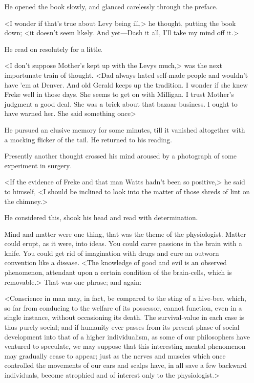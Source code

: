 He opened the book slowly, and glanced carelessly through the preface.

<I wonder if that's true about Levy being ill,> he thought, putting the book down; <it doesn't seem likely. And yet—Dash it all, I'll take my mind off it.>

He read on resolutely for a little.

<I don't suppose Mother's kept up with the Levys much,> was the next importunate train of thought. <Dad always hated self-made people and wouldn't have 'em at Denver. And old Gerald keeps up the tradition. I wonder if she knew Freke well in those days. She seems to get on with Milligan. I trust Mother's judgment a good deal. She was a brick about that bazaar business. I ought to have warned her. She said something once\longdash>

He pursued an elusive memory for some minutes, till it vanished altogether with a mocking flicker of the tail. He returned to his reading.

Presently another thought crossed his mind aroused by a photograph of some experiment in surgery.

<If the evidence of Freke and that man Watts hadn't been so positive,> he said to himself, <I should be inclined to look into the matter of those shreds of lint on the chimney.>

He considered this, shook his head and read with determination.

Mind and matter were one thing, that was the theme of the physiologist. Matter could erupt, as it were, into ideas. You could carve passions in the brain with a knife. You could get rid of imagination with drugs and cure an outworn convention like a disease. <The knowledge of good and evil is an observed phenomenon, attendant upon a certain condition of the brain-cells, which is removable.> That was one phrase; and again:

<Conscience in man may, in fact, be compared to the sting of a hive-bee, which, so far from conducing to the welfare of its possessor, cannot function, even in a single instance, without occasioning its death. The survival-value in each case is thus purely social; and if humanity ever passes from its present phase of social development into that of a higher individualism, as some of our philosophers have ventured to speculate, we may suppose that this interesting mental phenomenon may gradually cease to appear; just as the nerves and muscles which once controlled the movements of our ears and scalps have, in all save a few backward individuals, become atrophied and of interest only to the physiologist.>

